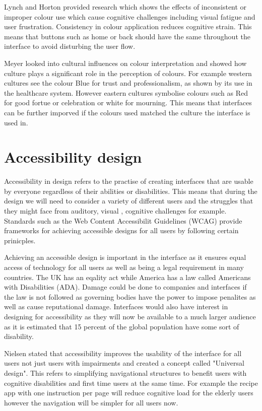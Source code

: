 \documentclass[]{project_interim}
\begin{document}
Lynch and Horton provided research which shows the effects of inconsistent or improper colour use which cause cognitive challenges including visual fatigue and user frustration. Consistency in colour application reduces cognitive strain.
This means that buttons such as home or back should have the same throughout the interface to avoid disturbing the user flow.\cite{fialkowski_considering_2024}

Meyer looked into cultural influences on colour interpretation and showed how culture plays a significant role in the perception of colours. For example western cultures see the colour Blue for trust and professionalism, as shown by its use in the healthcare system.
However eastern cultures symbolise colours such as Red for good fortue or celebration or white for mourning.
This means that interfaces can be further imporved if the colours used matched the culture the interface is used in.


\section{Accessibility design}

Accessibility in design refers to the practise of creating interfaces that are usable by everyone regardless of their abilities or disabilities. This means that during the design we will need to consider a variety of different users and the struggles that they might face from auditory, visual , cognitive challenges for example.
Standards such as the Web Content Accessibilit Guidelines (WCAG) provide frameworks for achieving accessible designs for all users by following certain prinicples.\cite{initiative_wai_wcag_nodate}

Achieving an accessible design is important in the interface as it ensures equal access of technology for all users as well as being a legal requirement in many countries. The UK has an eqality act while America has a law called Americans with Disabilities (ADA). Damage could be done to companies and interfaces if the law is not followed as governing bodies have the power to impose penalites as well as cause reputational damage.
Interfaces would also have interest in designing for accessibility as they will now be available to a much larger audience as it is estimated that 15 percent of the global population have some sort of disability.

Nielsen stated that accessibility improves the usability of the interface for all users not just users with impairments and created a concept called "Universal design".
This refers to simplifying navigational structures to benefit users with cognitive disabilities and first time users at the same time. For example the recipe app with one instruction per page will reduce cognitive load for the elderly users however the navigation will be simpler for all users now.\cite{noauthor_accessibility_nodate}
\end{document}
